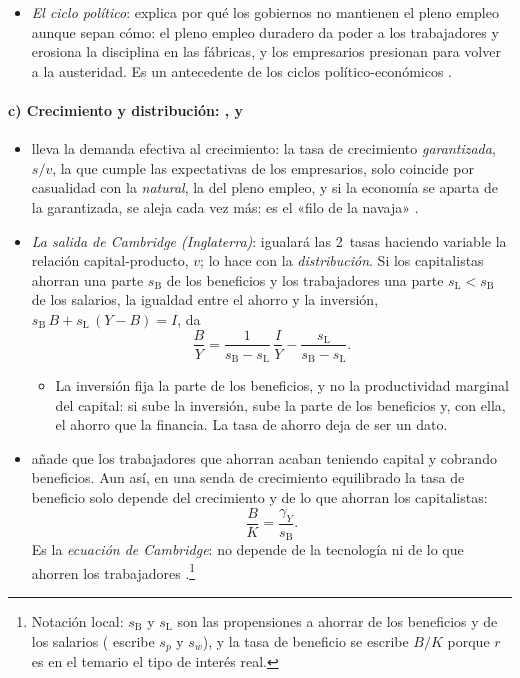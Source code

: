 \documentclass[11pt]{article}
\begin{document}
\begin{itemize}
\item \emph{El ciclo político}: \textcite{Kalecki1943Political} explica por qué los gobiernos no mantienen el pleno empleo aunque sepan cómo: el pleno empleo duradero da poder a los trabajadores y erosiona la disciplina en las fábricas, y los empresarios presionan para volver a la austeridad. Es un antecedente de los ciclos político-económicos .
\end{itemize}

\paragraph{c) Crecimiento y distribución: ,  y }

\begin{itemize}
\item {} lleva la demanda efectiva al crecimiento\nocite{Harrod1939}: la tasa de crecimiento \emph{garantizada}, $s/v$, la que cumple las expectativas de los empresarios, solo coincide por casualidad con la \emph{natural}, la del pleno empleo, y si la economía se aparta de la garantizada, se aleja cada vez más: es el «filo de la navaja» .
\item \emph{La salida de Cambridge (Inglaterra)}:  igualará las 2~tasas haciendo variable la relación capital-producto, $v$; \textcite{Kaldor1956Alternative} lo hace con la \emph{distribución}. Si los capitalistas ahorran una parte $s_{\mathrm{B}}$ de los beneficios y los trabajadores una parte $s_{\mathrm{L}}<s_{\mathrm{B}}$ de los salarios, la igualdad entre el ahorro y la inversión, $s_{\mathrm{B}}\,B+s_{\mathrm{L}}\,(Y-B)=I$, da
  \begin{equation}
  \frac{B}{Y}=\frac{1}{s_{\mathrm{B}}-s_{\mathrm{L}}}\,\frac{I}{Y}-\frac{s_{\mathrm{L}}}{s_{\mathrm{B}}-s_{\mathrm{L}}}. \label{eq:kaldor}
  \end{equation}
  \begin{itemize}
  \item La inversión fija la parte de los beneficios, y no la productividad marginal del capital: si sube la inversión, sube la parte de los beneficios y, con ella, el ahorro que la financia. La tasa de ahorro deja de ser un dato.
  \end{itemize}
\item \textcite{Pasinetti1962Rate} añade que los trabajadores que ahorran acaban teniendo capital y cobrando beneficios. Aun así, en una senda de crecimiento equilibrado la tasa de beneficio solo depende del crecimiento y de lo que ahorran los capitalistas:
  \begin{equation}
  \frac{B}{K}=\frac{\gamma_Y}{s_{\mathrm{B}}}. \label{eq:pasinetti}
  \end{equation}
  Es la \emph{ecuación de Cambridge}: no depende de la tecnología ni de lo que ahorren los trabajadores  .\footnote{Notación local: $s_{\mathrm{B}}$ y $s_{\mathrm{L}}$ son las propensiones a ahorrar de los beneficios y de los salarios ( escribe $s_p$ y $s_w$), y la tasa de beneficio se escribe $B/K$ porque $r$ es en el temario el tipo de interés real.}
\end{itemize}
\end{document}
